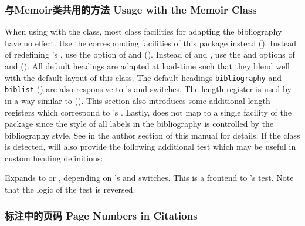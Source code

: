 \subsubsection{与Memoir类共用的方法 Usage with the Memoir Class}
\label{use:cav:mem}

When using \biblatex with the  class, most class facilities for adapting the bibliography have no effect. Use the corresponding facilities of this package instead (). Instead of redefining 's , use the  option of  and  (). Instead of  and , use the  and  options of  and  (). All default headings are adapted at load-time such that they blend well with the default layout of this class. The default headings \texttt{bibliography} and \texttt{biblist} () are also responsive to 's  and  switches. The length register  is used by \biblatex in a way similar to  (). This section also introduces some additional length registers which correspond to 's . Lastly,  does not map to a single facility of the \biblatex package since the style of all labels in the bibliography is controlled by the bibliography style. See  in the author section of this manual for details. If the  class is detected, \biblatex will also provide the following additional test which may be useful in custom heading definitions:

\begin{ltxsyntax}


Expands to  or , depending on 's  and  switches. This is a \latex frontend to 's  test. Note that the logic of the test is reversed.

\end{ltxsyntax}

\subsubsection{标注中的页码 Page Numbers in Citations}
\label{use:cav:pag}

